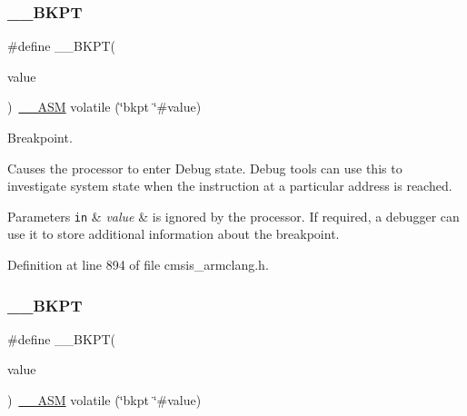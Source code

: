 \subsubsection{\texorpdfstring{\+\_\+\+\_\+\+B\+K\+PT}{\_\_BKPT}\hspace{0.1cm}{\footnotesize\ttfamily [2/3]}}
{\footnotesize\ttfamily \#define \+\_\+\+\_\+\+B\+K\+PT(\begin{DoxyParamCaption}\item[{}]{value }\end{DoxyParamCaption})~\hyperlink{cmsis__iccarm_8h_a1378040bcf22428955c6e3ce9c2053cd}{\+\_\+\+\_\+\+A\+SM} volatile (\char`\"{}bkpt \char`\"{}\#value)}



Breakpoint. 

Causes the processor to enter Debug state. Debug tools can use this to investigate system state when the instruction at a particular address is reached. 
\begin{DoxyParams}[1]{Parameters}
\mbox{\tt in}  & {\em value} & is ignored by the processor. If required, a debugger can use it to store additional information about the breakpoint. \\
\hline
\end{DoxyParams}


Definition at line 894 of file cmsis\+\_\+armclang.\+h.

\mbox{\label{group___c_m_s_i_s___core___instruction_interface_ga15ea6bd3c507d3e81c3b3a1258e46397}} 
\subsubsection{\texorpdfstring{\+\_\+\+\_\+\+B\+K\+PT}{\_\_BKPT}\hspace{0.1cm}{\footnotesize\ttfamily [3/3]}}
{\footnotesize\ttfamily \#define \+\_\+\+\_\+\+B\+K\+PT(\begin{DoxyParamCaption}\item[{}]{value }\end{DoxyParamCaption})~\hyperlink{cmsis__iccarm_8h_a1378040bcf22428955c6e3ce9c2053cd}{\+\_\+\+\_\+\+A\+SM} volatile (\char`\"{}bkpt \char`\"{}\#value)}




